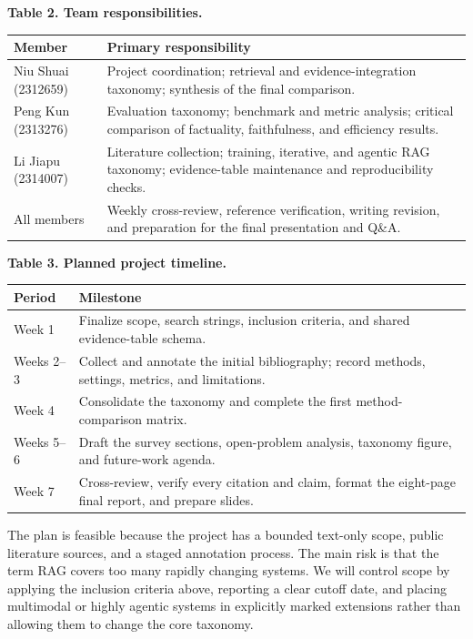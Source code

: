 \documentclass[10.5pt,compsoc]{CjC}
\begin{document}
\begin{center}
\small
\textbf{Table 2. Team responsibilities.}\par\smallskip
\centering
\begin{tabularx}{\columnwidth}{>{\raggedright\arraybackslash}p{25mm} X}
\toprule
\textbf{Member} & \textbf{Primary responsibility} \\
\midrule
Niu Shuai (2312659) & Project coordination; retrieval and evidence-integration taxonomy; synthesis of the final comparison. \\
Peng Kun (2313276) & Evaluation taxonomy; benchmark and metric analysis; critical comparison of factuality, faithfulness, and efficiency results. \\
Li Jiapu (2314007) & Literature collection; training, iterative, and agentic RAG taxonomy; evidence-table maintenance and reproducibility checks. \\
All members & Weekly cross-review, reference verification, writing revision, and preparation for the final presentation and Q\&A. \\
\bottomrule
\end{tabularx}
\end{center}

\begin{center}
\small
\textbf{Table 3. Planned project timeline.}\par\smallskip
\centering
\begin{tabularx}{\columnwidth}{p{18mm} X}
\toprule
\textbf{Period} & \textbf{Milestone} \\
\midrule
Week 1 & Finalize scope, search strings, inclusion criteria, and shared evidence-table schema. \\
Weeks 2--3 & Collect and annotate the initial bibliography; record methods, settings, metrics, and limitations. \\
Week 4 & Consolidate the taxonomy and complete the first method-comparison matrix. \\
Weeks 5--6 & Draft the survey sections, open-problem analysis, taxonomy figure, and future-work agenda. \\
Week 7 & Cross-review, verify every citation and claim, format the eight-page final report, and prepare slides. \\
\bottomrule
\end{tabularx}
\end{center}

The plan is feasible because the project has a bounded text-only scope, public literature sources, and a staged annotation process. The main risk is that the term RAG covers too many rapidly changing systems. We will control scope by applying the inclusion criteria above, reporting a clear cutoff date, and placing multimodal or highly agentic systems in explicitly marked extensions rather than allowing them to change the core taxonomy.
\end{document}
